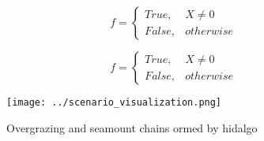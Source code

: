 \documentclass[a4paper]{article}
\begin{document}
\begin{equation}   f =
\begin{cases} True, & X \neq 0\\
False, & otherwise
\end{cases}
\end{equation}

\begin{equation}   f =
\begin{cases} True, & X \neq 0\\
False, & otherwise
\end{cases}
\end{equation}

\begin{figure}
\centering
\texttt{[image: ../scenario\_visualization.png]}
\caption{Overgrazing and seamount chains ormed by hidalgo 
}
\end{figure}
 
\end{document}

